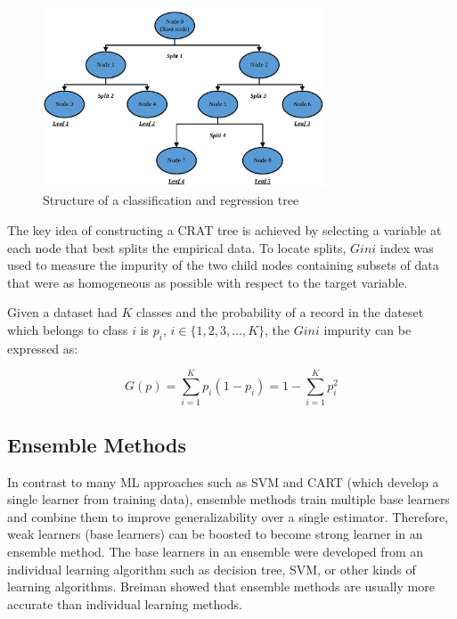 \documentclass[11pt]{article}
\begin{document}
	
	\begin{figure}[!htb]
		\begin{center}
			\includegraphics[width=0.75\textwidth]{CART}
		\end{center}
		\caption{Structure of a classification and regression tree \cite{put2003classification}}
		\label{fig:CART}
	\end{figure}
	
	
The key idea of constructing a CRAT tree is achieved by selecting a variable at each node that best splits the empirical data. To locate splits, $Gini$ index was used to measure the impurity of the two child nodes containing subsets of data that were as homogeneous as possible with respect to the target variable.

	Given a dataset had $K$ classes and the probability of a record in the dateset which belongs to class $i$ is $p_i$, $i \in \{1,2,3,...,K\}$, the $Gini$ impurity can be expressed as:
	
	\begin{equation}
	G(p) = \sum_{i=1}^{K}p_i(1-p_i) = 1- \sum_{i=1}^{K}p_i^2
	\end{equation}
	
	
	\subsection{Ensemble Methods}
	In contrast to many ML approaches such as SVM and CART (which develop a single learner from training data), ensemble methods train multiple base learners and combine them \cite{chou2014machine} to improve generalizability over a single estimator. Therefore, weak learners (base learners) can be boosted to become strong learner \cite{frosyniotis2003divide} in an ensemble method. The base learners in an ensemble were developed from an individual learning algorithm such as decision tree, SVM, or other kinds of learning algorithms. Breiman \cite{dietterich2000ensemble} showed that ensemble methods are usually more accurate than individual learning methods.
	
\end{document}
